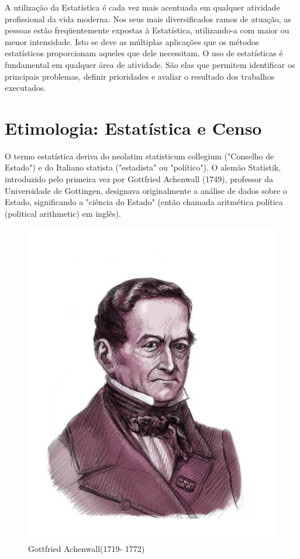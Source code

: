 A utilização da Estatística é cada vez mais acentuada em qualquer atividade profissional da vida moderna. Nos seus mais diversificados ramos de atuação, as pessoas estão freqüentemente expostas à Estatística, utilizando-a com maior ou menor intensidade. Isto se deve as múltiplas aplicações que os métodos estatísticos proporcionam aqueles que dele necessitam. O uso de estatísticas é fundamental em qualquer área de atividade. São elas que permitem identificar os principais problemas, definir prioridades e avaliar o resultado dos trabalhos executados.\vskip0.3cm


\section{Etimologia: Estatística e Censo}

\inic O termo estatística deriva do neolatim statisticum collegium
("Conselho de Estado") e do Italiano statista ("estadista" ou
"político"). O alemão Statistik, introduzido pelo primeira vez por
Gottfried Achenwall (1749), professor da Universidade de
Gottingen, designava originalmente a análise de dados sobre o
Estado, significando a "ciência do Estado" (então chamada
aritmética política (political arithmetic) em inglês). 

\vspace{-5.25cm}
\begin{figure}
\centering
\includegraphics[scale=0.35]{figures/gottfried_achenwall.jpeg}
\vspace{-0.2cm}
\caption{Gottfried Achenwall(1719- 1772)}
\label{fig:my_label8}
\end{figure}







